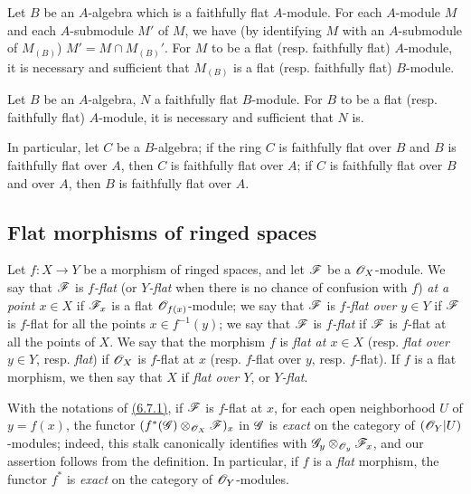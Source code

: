\begin{env}[6.6.3]
\label{env-0.6.6.3}
Let $B$ be an $A$-algebra which is a faithfully flat $A$-module. For each $A$-module $M$ and
each $A$-submodule $M'$ of $M$, we have (by identifying $M$ with an $A$-submodule of
$M_{(B)}$) $M'=M\cap M_{(B)}'$. For $M$ to be a flat (resp. faithfully flat) $A$-module, it
is necessary and sufficient that $M_{(B)}$ is a flat (resp. faithfully flat) $B$-module.
\end{env}

\begin{env}[6.6.4]
\label{env-0.6.6.4}
Let $B$ be an $A$-algebra, $N$ a faithfully flat $B$-module. For $B$ to be a flat
(resp. faithfully flat) $A$-module, it is necessary and sufficient that $N$ is.

In particular, let $C$ be a $B$-algebra; if the ring $C$ is faithfully flat over $B$ and $B$
is faithfully flat over $A$, then $C$ is faithfully flat over $A$; if $C$ is faithfully flat
over $B$ and over $A$, then $B$ is faithfully flat over $A$.
\end{env}

\subsection{Flat morphisms of ringed spaces}
\label{subsection-flat-morphisms-of-ringed-spaces}

\begin{env}[6.7.1]
\label{env-0.6.7.1}
Let $f:X\to Y$ be a morphism of ringed spaces, and let $\mathscr{F}$ be a $\mathscr{O}_X$-module. We say
that $\mathscr{F}$ is {\em $f$-flat} (or {\em $Y$-flat} when there is no chance of confusion
with $f$) {\em at a point $x\in X$} if $\mathscr{F}_x$ is a flat $\mathscr{O}_{f(x)}$-module; we say that
$\mathscr{F}$ is {\em $f$-flat over $y\in Y$} if $\mathscr{F}$ is $f$-flat for all the points
$x\in f^{-1}(y)$; we say that $\mathscr{F}$ is {\em $f$-flat} if $\mathscr{F}$ is $f$-flat at all the
points of $X$. We say that the morphism $f$ is {\em flat at $x\in X$} (resp. {\em flat over
$y\in Y$}, resp. {\em flat}) if $\mathscr{O}_X$ is $f$-flat at $x$ (resp. $f$-flat over $y$, resp.
$f$-flat). If $f$ is a flat morphism, we then say that $X$ if {\em flat over $Y$}, or
{\em $Y$-flat}.
\end{env}

\begin{env}[6.7.2]
\label{env-0.6.7.2}
With the notations of \hyperref[env-0.6.7.1]{(6.7.1)}, if $\mathscr{F}$ is $f$-flat at $x$, for each open
neighborhood $U$ of $y=f(x)$, the functor $(f^*(\mathscr{G})\otimes_{\mathscr{O}_X}\mathscr{F})_x$ in $\mathscr{G}$
is {\em exact} on the category of $(\mathscr{O}_Y|U)$-modules; indeed, this stalk canonically
identifies with $\mathscr{G}_y\otimes_{\mathscr{O}_y}\mathscr{F}_x$, and our assertion follows from the
definition. In particular, if $f$ is a {\em flat} morphism, the functor $f^*$ is
{\em exact} on the category of $\mathscr{O}_Y$-modules.
\end{env}


